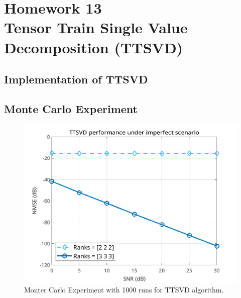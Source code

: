 \documentclass[a4paper,10pt]{article}
\begin{document}
\newpage
\section*{Homework 13 \\ Tensor Train Single Value Decomposition (TTSVD)}

    \subsection*{Implementation of TTSVD}

    \subsection*{Monte Carlo Experiment}

    \begin{figure}[ht!]
        \centering 
        \includegraphics[width=0.75\linewidth]{figs/hw13.png} \par 
        \caption{Monter Carlo Experiment with 1000 runs for TTSVD algorithm.}
        \label{fig:hw13} 
    \end{figure}

%
%
\end{document}
